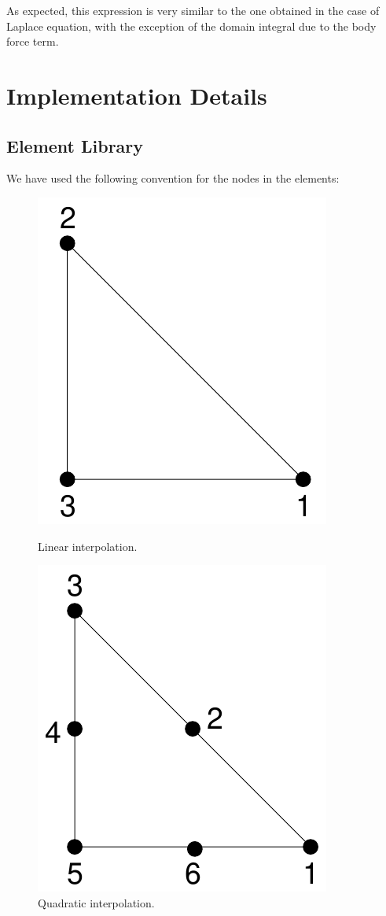 \documentclass[12pt]{report}
\begin{document}
As expected, this expression is very similar to the one obtained in the case of Laplace equation, with the exception of the domain integral due to the body force term.
\pagebreak

\part{Implementation Details}
\pagebreak
\section*{}
\pagebreak

\chapter{Element Library}
We have used the following convention for the nodes in the elements:

\begin{figure}[!hbt]
\begin{minipage}[b]{0.5\linewidth}
\centering
\includegraphics[width = 0.4\linewidth]{tria3.pdf}
\caption{Linear interpolation.}
\end{minipage}
\hspace{0.5cm}
\begin{minipage}[b]{0.5\linewidth}
\centering
\includegraphics[width = 0.4\linewidth]{tria6.pdf}
\caption{Quadratic interpolation.}
\end{minipage}
\end{figure}
\end{document}
